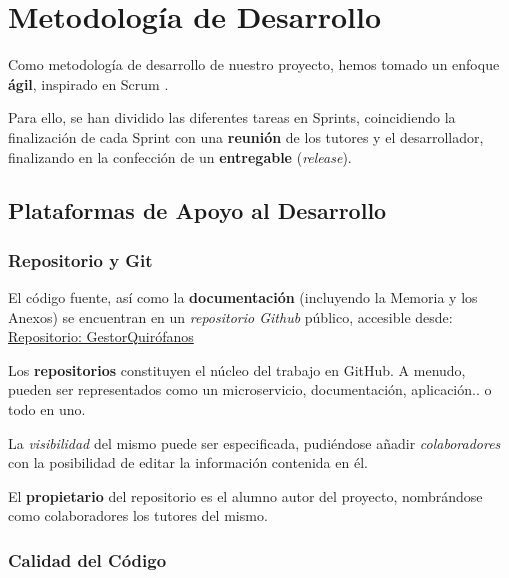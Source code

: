 
\section{Metodología de Desarrollo}

Como metodología de desarrollo de nuestro proyecto, hemos tomado un enfoque \textbf{ágil}, inspirado en Scrum \cite{Palacio2022ScrumMaster}.

Para ello, se han dividido las diferentes tareas en Sprints, coincidiendo la finalización de cada Sprint con una \textbf{reunión} de los tutores y el desarrollador, finalizando en la confección de un \textbf{entregable} (\textit{release}).


\subsection{Plataformas de Apoyo al Desarrollo}

\subsubsection{Repositorio y Git}

El código fuente, así como la \textbf{documentación} (incluyendo la Memoria y los Anexos) se encuentran en un \textit{repositorio Github} público, accesible desde: \href{https://github.com/jesgararm/GestorQuirofanos}{Repositorio: GestorQuirófanos}

Los \textbf{repositorios} constituyen el núcleo del trabajo en GitHub. A menudo, pueden ser representados como un microservicio, documentación, aplicación.. o todo en uno. 

La \textit{visibilidad} del mismo puede ser especificada, pudiéndose añadir \textit{colaboradores} con la posibilidad de editar la información contenida en él.

El \textbf{propietario} del repositorio es el alumno autor del proyecto, nombrándose como colaboradores los tutores del mismo.



\subsubsection{Calidad del Código}

